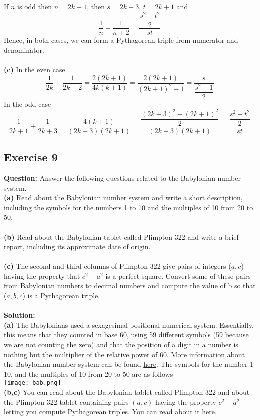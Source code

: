 \documentclass{article}
\begin{document}
If $n$ is odd then $n = 2k+1$, then $s = 2k+3$, $t = 2k+1$ and
\begin{equation*}
\dfrac{1}{n}+\dfrac{1}{n+2}=\dfrac{\dfrac{s^2-t^2}{2}}{st}
\end{equation*}
Hence, in both cases, we can form a Pythagorean triple from numerator and denominator.\\
\\\textbf{(c)} In the even case
\begin{equation*}
\dfrac{1}{2k}+\dfrac{1}{2k+2}=\dfrac{2(2k+1)}{4k(k+1)}=\dfrac{2(2k+1)}{(2k+1)^{2}-1}=\dfrac{s}{\dfrac{s^2-1}{2}}
\end{equation*}
In the odd case
\begin{equation*}
\dfrac{1}{2k+1}+\dfrac{1}{2k+3}=\dfrac{4(k+1)}{(2k+3)(2k+1)}=\dfrac{\dfrac{(2k+3)^{2}-(2k+1)^{2}}{2}}{(2k+3)(2k+1)}=\dfrac{\dfrac{s^2-t^2}{2}}{st}
\end{equation*}
\newpage
\subsection{Exercise 9}
\textbf{Question:} Answer the following questions related to the Babylonian number system.\\
\textbf{(a)} Read about the Babylonian number system and write a short description, including the symbols for the numbers 1 to 10 and the multiples of 10 from 20 to 50.\\
\\\textbf{(b)} Read about the Babylonian tablet called Plimpton 322 and write a brief report, including its approximate date of origin.\\
\\\textbf{(c)} The second and third columns of Plimpton 322 give pairs of integers ($a, c$) having the property that $c^{2}-a^{2}$ is a perfect square. Convert some of these pairs from Babylonian numbers to decimal numbers and compute the value of b so that ($a, b, c$) is a Pythagorean triple.\\
\\\textbf{Solution:}\\
\textbf{(a)} The Babylonians used a sexagesimal positional numerical system. Essentially, this means that they counted in base 60, using 59 different symbols (59 because we are not counting the zero) and that the position of a digit in a number is nothing but the multiplier of the relative power of 60. More information about the Babylonian number system can be found \href{https://mathshistory.st-andrews.ac.uk/HistTopics/Babylonian_numerals/}{here}. The symbols for the number 1-10, and the multiples of 10 from 20 to 50 are as follows\\
\texttt{[image: bab.png]}
\\\textbf{(b,c)} You can read about the Babylonian tablet called Plimpton 322 and about the Plimpton 322 tablet containing pairs $(a,c)$ having the property $c^{2}-a^{2}$ letting you compute Pythagorean triples. You can read about it \href{https://personal.math.ubc.ca/~cass/courses/m446-03/pl322/pl322.html}{here}.\\
\end{document}
